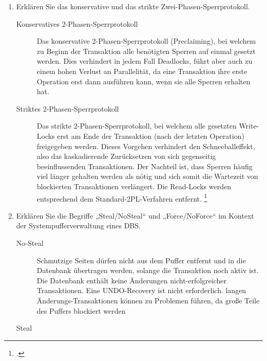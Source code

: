 \documentclass{lehramt-informatik-aufgabe}
\begin{document}
\begin{enumerate}

\item Erklären Sie das konservative und das strikte
Zwei-Phasen-Sperrprotokoll.

\begin{liAntwort}
\begin{description}

\item[Konservatives 2-Phasen-Sperrprotokoll]

Das konservative 2-Phasen-Sperrprotokoll (Preclaiming), bei welchem zu
Beginn der Transaktion alle benötigten Sperren auf einmal gesetzt
werden. Dies verhindert in jedem Fall Deadlocks, führt aber auch zu
einem hohen Verlust an Parallelität, da eine Transaktion ihre erste
Operation erst dann ausführen kann, wenn sie alle Sperren erhalten hat.

\item[Striktes 2-Phasen-Sperrprotokoll]

Das strikte 2-Phasen-Sperrprotokoll, bei welchem alle gesetzten
Write-Locks erst am Ende der Transaktion (nach der letzten Operation)
freigegeben werden. Dieses Vorgehen verhindert den Schneeballeffekt,
also das kaskadierende Zurücksetzen von sich gegenseitig beeinflussenden
Transaktionen. Der Nachteil ist, dass Sperren häufig viel länger
gehalten werden als nötig und sich somit die Wartezeit von blockierten
Transaktionen verlängert. Die Read-Locks werden entsprechend dem
Standard-2PL-Verfahren entfernt.
\footcite{wiki:sperrverfahren}
\end{description}
\end{liAntwort}


\item Erklären Sie die Begriffe „Steal/NoSteal“ und „Force/NoForce“ im
Kontext der Systempufferverwaltung eines DBS.

\begin{liAntwort}
\begin{description}
\item [No-Steal]

Schmutzige Seiten dürfen nicht aus dem Puffer entfernt und in die
Datenbank übertragen werden, solange die Transaktion noch aktiv ist. Die
Datenbank enthält keine Änderungen nicht-erfolgreicher Transaktionen.
Eine UNDO-Recovery ist nicht erforderlich. langen
Änderungs-Transaktionen können zu Problemen führen, da große Teile des
Puffers blockiert werden

\item [Steal]


\end{description}
\end{liAntwort}
\end{enumerate}
\end{document}
